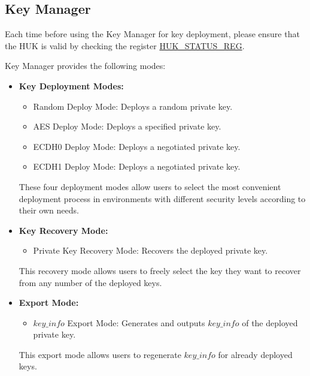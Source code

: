 \documentclass[main\_\_EN.tex]{subfiles}
\begin{document}
\subsection{Key Manager}
\label{sec:key-manager}
\begin{tiplisting}
Each time before using the Key Manager for key deployment, please ensure that the HUK is valid by checking the register \hyperref[regdesc:HUKSTATUSREG]{HUK\_STATUS\_REG}.
\end{tiplisting}

Key Manager provides the following modes:
\begin{itemize}
    \item \textbf{Key Deployment Modes:}
    \begin{itemize}
        \item Random Deploy Mode: Deploys a random private key.
        \item AES Deploy Mode: Deploys a specified private key.
        \item ECDH0 Deploy Mode: Deploys a negotiated private key.
        \item ECDH1 Deploy Mode: Deploys a negotiated private key.
    \end{itemize}
    These four deployment modes allow users to select the most convenient deployment process in environments with different security levels according to their own needs.
    \item \textbf{Key Recovery Mode:}
        \begin{itemize}
            \item Private Key Recovery Mode: Recovers the deployed private key.
        \end{itemize}
    This recovery mode allows users to freely select the key they want to recover from any number of the deployed keys.
    \item \textbf{Export Mode:}
    \begin{itemize}
        \item \hyperref[para:keyinfo]{\begin{math}key\_info\end{math}} Export Mode: Generates and outputs \hyperref[para:keyinfo]{\begin{math}key\_info\end{math}} of the deployed private key.
    \end{itemize}
    This export mode allows users to regenerate \hyperref[para:keyinfo]{\begin{math}key\_info\end{math}} for already deployed keys.
\end{itemize}
\end{document}
